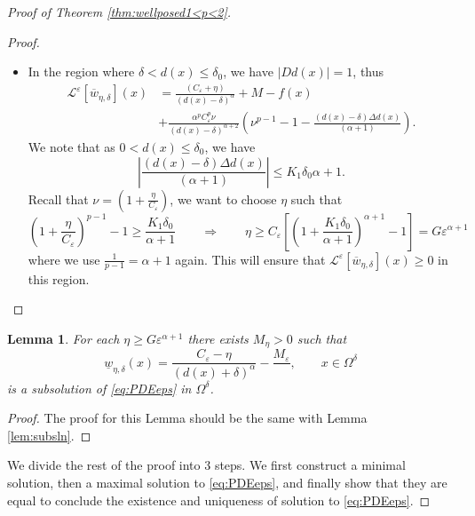 \documentclass[11pt,reqno]{amsart}
\numberwithin{figure}{section}
\theoremstyle{plain}
\newtheorem{lem}[thm]{Lemma}
\theoremstyle{remark}
\numberwithin{equation}{section}
\begin{document}
\begin{appendices}
\begin{proof} [Proof of Theorem \ref{thm:wellposed1<p<2}]
\begin{proof}
\begin{itemize}
    \item In the region where $\delta < d(x)\leq \delta_0$, we have $|Dd(x)|=1$, thus
    \begin{align*}
         \mathcal{L}^\varepsilon\left[\overline{w}_{\eta,\delta}\right](x) &= \frac{ (C_\varepsilon + \eta)}{(d(x)-\delta)^\alpha} + M - f(x)\\
         & + \frac{\alpha^p C_\varepsilon^p\nu }{(d(x)-\delta)^{\alpha+2}}\left(\nu^{p-1} - 1 - \frac{ (d(x)-\delta)\Delta d(x)}{(\alpha+1)}\right).
    \end{align*}
    We note that as $0<d(x)\leq \delta_0$, we have
    \begin{equation*}
        \left|\frac{(d(x)-\delta)\Delta  d(x)}{(\alpha+1)}\right| \leq {K_1\delta_0}{\alpha+1}.
    \end{equation*}
    Recall that $\nu = \left(1+\frac{\eta}{C_\varepsilon}\right)$, we want to choose $\eta$ such that
    \begin{equation*}
        \left(1+\frac{\eta}{C_\varepsilon}\right)^{p-1} - 1 \geq \frac{K_1\delta_0}{\alpha+1} \qquad\Longrightarrow\qquad \eta \geq C_\varepsilon\left[\left(1+\frac{K_1\delta_0}{\alpha+1}\right)^{\alpha+1}-1\right] = G\varepsilon^{\alpha+1}
    \end{equation*}
    where we use $\frac{1}{p-1} = \alpha+1$ again. This will ensure that $\mathcal{L}^\varepsilon\left[\overline{w}_{\eta,\delta}\right](x) \geq 0$ in this region.
\end{itemize}
\end{proof}

\begin{lem}\label{lem:supersln} For each $\eta\geq G\varepsilon^{\alpha+1}$ there exists $M_\eta > 0$ such that 
\begin{equation*}
    \underline{w}_{\eta, \delta}(x) = \frac{C_\varepsilon-\eta}{(d(x)+\delta)^\alpha} -\frac{M_\varepsilon}{ }, \qquad x\in \Omega^\delta 
\end{equation*}
is a subsolution of \eqref{eq:PDEeps} in $\Omega^\delta$.
\end{lem}

\begin{proof} The proof for this Lemma should be the same with Lemma \ref{lem:subsln}.
\end{proof}

\noindent We divide the rest of the proof into 3 steps. We first construct a minimal solution, then a maximal solution to \eqref{eq:PDEeps}, and finally show that they are equal to conclude the existence and uniqueness of solution to \eqref{eq:PDEeps}.


\end{proof}
\end{appendices}
\end{document}
